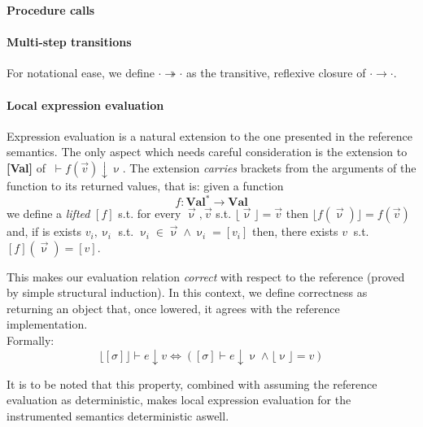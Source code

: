 \documentclass[12pt,a4paper,twoside]{book}
\begin{document}
\noindent\textbf{Procedure calls}
\begin{mathpar}
\end{mathpar}

\paragraph{Multi-step transitions}
For notational ease, we define $\cdot \twoheadrightarrow \cdot$ as the transitive, reflexive closure of $\cdot \rightarrow \cdot$.

\paragraph{Local expression evaluation}
Expression evaluation is a natural extension to the one presented in the reference semantics. The only aspect which needs careful consideration is the extension to \textbf{[Val]} of $~\vdash f(\vec{v}) \downarrow \upnu$.
The extension \emph{carries} brackets from the arguments of the function to its returned values, that is: given a function
$$
f: \textbf{Val}^{*} \rightarrow \textbf{Val}
$$
we define a \emph{lifted} $[f]$ s.t. for every $\vec{\upnu}, \vec{v}$ s.t.
$\lfloor \vec{\upnu} \rfloor = \vec{v}$ then
$\lfloor f(\vec{\upnu}) \rfloor = f(\vec{v}) $
and, if is exists $v_i, \upnu_i$ s.t. $\upnu_i \in \vec{\upnu} \land \upnu_i = [v_i]$ then, there exists $v~$ s.t. $ [f](\vec{\upnu}) = [v] $.


This makes our evaluation relation \emph{correct} with respect to the reference (proved by simple structural induction). In this context, we define correctness as returning an object that, once lowered, it agrees with the reference implementation.\\
Formally:
\begin{equation}\label{inst:loc_correct}
\lfloor [\sigma] \rfloor \vdash e \downarrow v \Leftrightarrow ( [\sigma] \vdash e \downarrow \upnu \land \lfloor \upnu \rfloor = v )
\end{equation}

It is to be noted that this property, combined with assuming the reference evaluation as deterministic, makes local expression evaluation for the instrumented semantics deterministic aswell.
\end{document}
